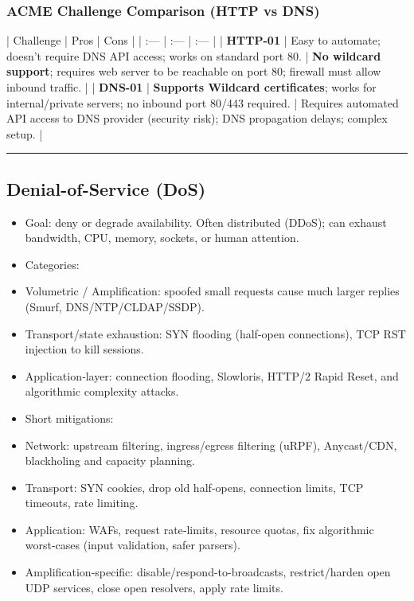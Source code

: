 \documentclass{article}
\begin{document}
\subsubsection{ACME Challenge Comparison (HTTP vs DNS)}
| Challenge | Pros | Cons |
| :--- | :--- | :--- |
| \textbf{HTTP-01} | Easy to automate; doesn't require DNS API access; works on standard port 80. | \textbf{No wildcard support}; requires web server to be reachable on port 80; firewall must allow inbound traffic. |
| \textbf{DNS-01} | \textbf{Supports Wildcard certificates}; works for internal/private servers; no inbound port 80/443 required. | Requires automated API access to DNS provider (security risk); DNS propagation delays; complex setup. |

\hrule

\subsection{Denial-of-Service (DoS)}
\begin{itemize}
  \item Goal: deny or degrade availability. Often distributed (DDoS); can exhaust bandwidth, CPU, memory, sockets, or human attention.
\end{itemize}

\begin{itemize}
  \item Categories:
  \item Volumetric / Amplification: spoofed small requests cause much larger replies (Smurf, DNS/NTP/CLDAP/SSDP).
  \item Transport/state exhaustion: SYN flooding (half‑open connections), TCP RST injection to kill sessions.
  \item Application‑layer: connection flooding, Slowloris, HTTP/2 Rapid Reset, and algorithmic complexity attacks.
\end{itemize}

\begin{itemize}
  \item Short mitigations:
  \item Network: upstream filtering, ingress/egress filtering (uRPF), Anycast/CDN, blackholing and capacity planning.
  \item Transport: SYN cookies, drop old half‑opens, connection limits, TCP timeouts, rate limiting.
  \item Application: WAFs, request rate‑limits, resource quotas, fix algorithmic worst-cases (input validation, safer parsers).
  \item Amplification-specific: disable/respond-to-broadcasts, restrict/harden open UDP services, close open resolvers, apply rate limits.
\end{itemize}
\end{document}
